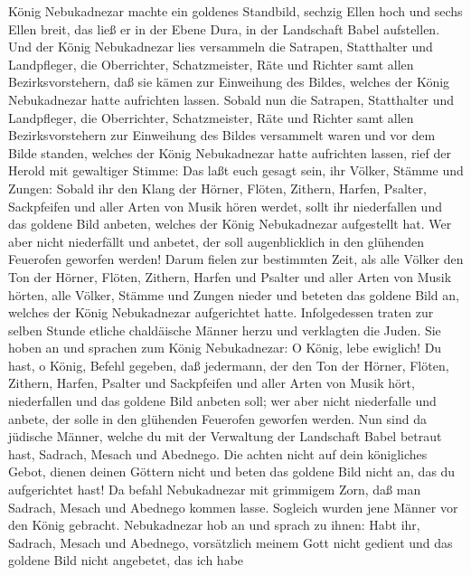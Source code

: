  König Nebukadnezar machte ein goldenes Standbild, sechzig
Ellen hoch und sechs Ellen breit, das ließ er in der Ebene Dura, in der
Landschaft Babel aufstellen.  Und der König Nebukadnezar
lies versammeln die Satrapen, Statthalter und Landpfleger, die
Oberrichter, Schatzmeister, Räte und Richter samt allen
Bezirksvorstehern, daß sie kämen zur Einweihung des Bildes, welches der
König Nebukadnezar hatte aufrichten lassen.  Sobald nun
die Satrapen, Statthalter und Landpfleger, die Oberrichter,
Schatzmeister, Räte und Richter samt allen Bezirksvorstehern zur
Einweihung des Bildes versammelt waren und vor dem Bilde standen,
welches der König Nebukadnezar hatte aufrichten lassen, 
rief der Herold mit gewaltiger Stimme: Das laßt euch gesagt sein, ihr
Völker, Stämme und Zungen:  Sobald ihr den Klang der
Hörner, Flöten, Zithern, Harfen, Psalter, Sackpfeifen und aller Arten
von Musik hören werdet, sollt ihr niederfallen und das goldene Bild
anbeten, welches der König Nebukadnezar aufgestellt hat. 
Wer aber nicht niederfällt und anbetet, der soll augenblicklich in den
glühenden Feuerofen geworfen werden!  Darum fielen zur
bestimmten Zeit, als alle Völker den Ton der Hörner, Flöten, Zithern,
Harfen und Psalter und aller Arten von Musik hörten, alle Völker, Stämme
und Zungen nieder und beteten das goldene Bild an, welches der König
Nebukadnezar aufgerichtet hatte.  Infolgedessen traten zur
selben Stunde etliche chaldäische Männer herzu und verklagten die Juden.
 Sie hoben an und sprachen zum König Nebukadnezar: O
König, lebe ewiglich!  Du hast, o König, Befehl gegeben,
daß jedermann, der den Ton der Hörner, Flöten, Zithern, Harfen, Psalter
und Sackpfeifen und aller Arten von Musik hört, niederfallen und das
goldene Bild anbeten soll;  wer aber nicht niederfalle
und anbete, der solle in den glühenden Feuerofen geworfen werden.
 Nun sind da jüdische Männer, welche du mit der
Verwaltung der Landschaft Babel betraut hast, Sadrach, Mesach und
Abednego. Die achten nicht auf dein königliches Gebot, dienen deinen
Göttern nicht und beten das goldene Bild nicht an, das du aufgerichtet
hast!  Da befahl Nebukadnezar mit grimmigem Zorn, daß man
Sadrach, Mesach und Abednego kommen lasse. Sogleich wurden jene Männer
vor den König gebracht.  Nebukadnezar hob an und sprach
zu ihnen: Habt ihr, Sadrach, Mesach und Abednego, vorsätzlich meinem
Gott nicht gedient und das goldene Bild nicht angebetet, das ich habe
